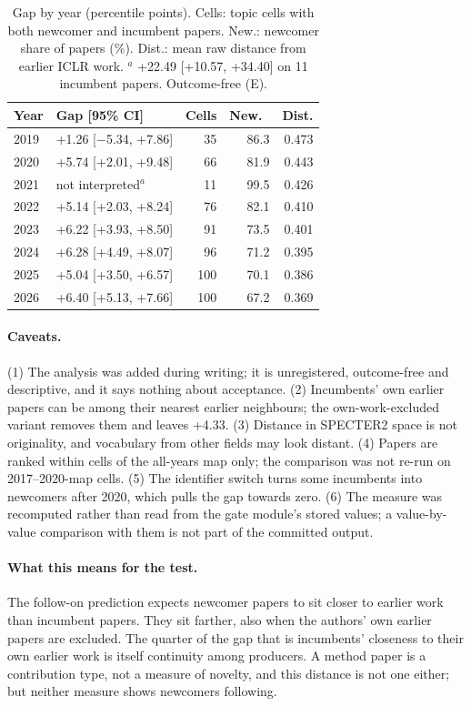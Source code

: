 \begin{table}[t]
\centering\footnotesize
\setlength{\tabcolsep}{3pt}
\begin{tabular}{@{}llrrr@{}}
\toprule
Year & Gap [95\% CI] & Cells & New.\ & Dist. \\
\midrule
2019 & +1.26 [$-$5.34, +7.86] & 35 & 86.3 & 0.473 \\
2020 & +5.74 [+2.01, +9.48] & 66 & 81.9 & 0.443 \\
2021 & not interpreted$^a$ & 11 & 99.5 & 0.426 \\
2022 & +5.14 [+2.03, +8.24] & 76 & 82.1 & 0.410 \\
2023 & +6.22 [+3.93, +8.50] & 91 & 73.5 & 0.401 \\
2024 & +6.28 [+4.49, +8.07] & 96 & 71.2 & 0.395 \\
2025 & +5.04 [+3.50, +6.57] & 100 & 70.1 & 0.386 \\
2026 & +6.40 [+5.13, +7.66] & 100 & 67.2 & 0.369 \\
\bottomrule
\end{tabular}
\caption{Gap by year (percentile points). Cells: topic cells with both newcomer and incumbent papers. New.: newcomer
share of papers (\%). Dist.: mean raw distance from earlier ICLR work. $^a$ +22.49 [+10.57, +34.40] on 11 incumbent
papers. Outcome-free (E).}
\label{tab:app-distyear}
\end{table}

\paragraph{Caveats.} (1) The analysis was added during writing; it is unregistered, outcome-free and descriptive, and
it says nothing about acceptance. (2) Incumbents' own earlier papers can be among their nearest earlier neighbours;
the own-work-excluded variant removes them and leaves +4.33. (3) Distance in SPECTER2 space is not originality, and
vocabulary from other fields may look distant. (4) Papers are ranked within cells of the all-years map only; the
comparison was not re-run on 2017--2020-map cells. (5) The identifier switch turns some incumbents into newcomers after
2020, which pulls the gap towards zero. (6) The measure was recomputed rather than read from the gate module's stored
values; a value-by-value comparison with them is not part of the committed output.

\paragraph{What this means for the test.} The follow-on prediction expects newcomer papers to sit closer to earlier
work than incumbent papers. They sit farther, also when the authors' own earlier papers are excluded. The quarter of
the gap that is incumbents' closeness to their own earlier work is itself continuity among producers. A method paper
is a contribution type, not a measure of novelty, and this distance is not one either; but neither measure shows
newcomers following.

